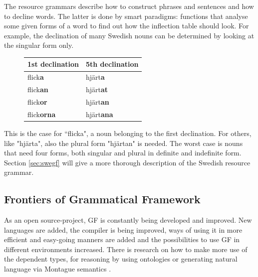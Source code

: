 \documentclass{report}
\begin{document}
The resource grammars describe how to construct phrases and sentences and how to
decline words. The latter is done by smart paradigms: functions that analyse
some given forms of a word to find out how the inflection table should look.
For example, the declination of many Swedish nouns can be determined by looking
at the singular form only. 
\begin{figure}
\begin{tabular}{| l | l |}
\hline
1st declination & 5th declination \\
\hline
flick\textbf{a}    &     hjärt\textbf{a}   \\
flick\textbf{an}    &    hjärt\textbf{at}  \\
flick\textbf{or}    &    hjärt\textbf{an}  \\
flick\textbf{orna}  &    hjärt\textbf{ana} \\
\hline
\end{tabular}
\end{figure}
This is the case for ``flicka", a noun belonging to the first declination. %
For others, like "hjärta", also the plural form "hjärtan" is needed.
The worst case is nouns that need four forms, both singular and
plural in definite and indefinite form.
Section \ref{sec:swegf} will give a more thorough description of the Swedish resource grammar.

\subsection{Frontiers of Grammatical Framework}
As an open source-project, GF is constantly being developed and improved. New
languages are added, the compiler is being improved, ways of using it in more 
efficient and easy-going manners are added
and the possibilities to use GF in different environments
increased. There is research on how to make more use of the dependent
types, for reasoning by using ontologies \cite{ontologies2} or generating natural
language via Montague semantics \cite{montague}.
\end{document}
